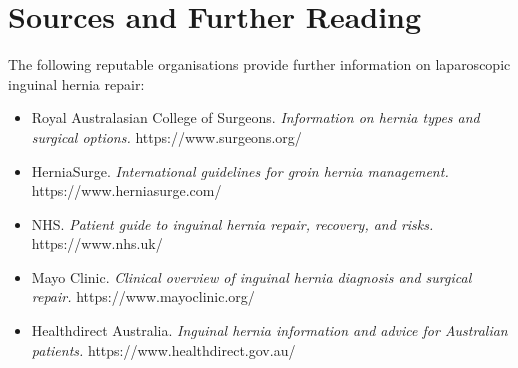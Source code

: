 \section*{Sources and Further Reading}
The following reputable organisations provide further information on laparoscopic inguinal hernia repair:

\begin{itemize}
    \item Royal Australasian College of Surgeons. \textit{Information on hernia types and surgical options.} https://www.surgeons.org/
    \item HerniaSurge. \textit{International guidelines for groin hernia management.} https://www.herniasurge.com/
    \item NHS. \textit{Patient guide to inguinal hernia repair, recovery, and risks.} https://www.nhs.uk/
    \item Mayo Clinic. \textit{Clinical overview of inguinal hernia diagnosis and surgical repair.} https://www.mayoclinic.org/
    \item Healthdirect Australia. \textit{Inguinal hernia information and advice for Australian patients.} https://www.healthdirect.gov.au/
\end{itemize}
